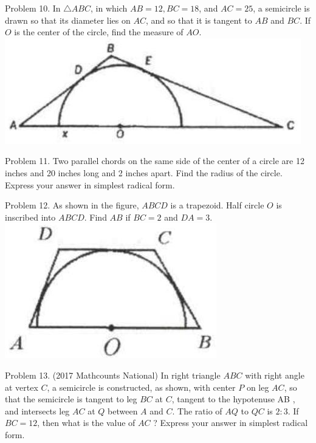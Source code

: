 \documentclass[10pt]{article}
\begin{document}
Problem 10. In \(\triangle A B C\), in which \(A B=12, B C=18\), and \(A C=25\), a semicircle is drawn so that its diameter lies on \(A C\), and so that it is tangent to \(A B\) and \(B C\). If \(O\) is the center of the circle, find the measure of \(A O\).\\
\includegraphics[max width=\textwidth, center]{2025_04_17_97bc1f7e44d93c271a88g-156}

Problem 11. Two parallel chords on the same side of the center of a circle are 12 inches and 20 inches long and 2 inches apart. Find the radius of the circle. Express your answer in simplest radical form.

Problem 12. As shown in the figure, \(A B C D\) is a trapezoid. Half circle \(O\) is inscribed into \(A B C D\). Find \(A B\) if \(B C=2\) and \(D A=3\).\\
\includegraphics[max width=\textwidth, center]{2025_04_17_97bc1f7e44d93c271a88g-156(1)}

Problem 13. (2017 Mathcounts National) In right triangle \(A B C\) with right angle at vertex \(C\), a semicircle is constructed, as shown, with center \(P\) on leg \(A C\), so that the semicircle is tangent to leg \(B C\) at \(C\), tangent to the hypotenuse AB , and intersects leg \(A C\) at \(Q\) between \(A\) and \(C\). The ratio of \(A Q\) to \(Q C\) is \(2: 3\). If \(B C=12\), then what is the value of \(A C\) ? Express your answer in simplest radical form.
\end{document}
